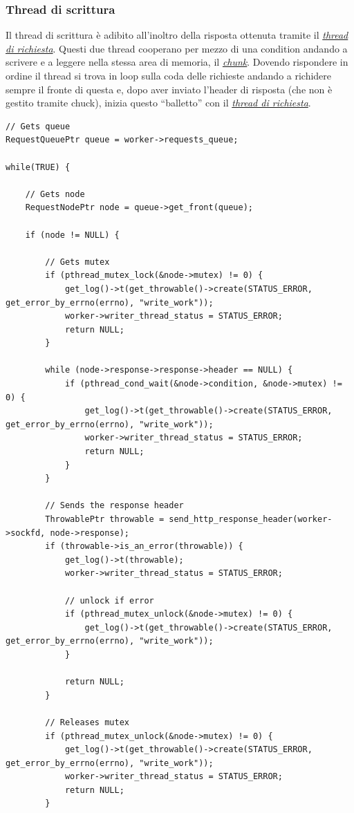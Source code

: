 \documentclass[italian]{tktltiki2}
\begin{document}
\subsubsection{Thread di scrittura}
\label{sec:writer}
Il thread di scrittura è adibito all'inoltro della risposta ottenuta tramite il \hyperref[sec:request]{\emph{thread di richiesta}}. Questi due thread cooperano per mezzo di una condition andando a scrivere e a leggere nella stessa area di memoria, il \hyperref[sec:chunk]{\emph{chunk}}. Dovendo rispondere in ordine il thread si trova in loop sulla coda delle richieste andando a richidere sempre il fronte di questa e, dopo aver inviato l'header di risposta (che non è gestito tramite chuck), inizia questo ``balletto'' con il \hyperref[sec:request]{\emph{thread di richiesta}}.
\begin{lstlisting}
// Gets queue
RequestQueuePtr queue = worker->requests_queue;

while(TRUE) {

    // Gets node
    RequestNodePtr node = queue->get_front(queue);

    if (node != NULL) {

        // Gets mutex
        if (pthread_mutex_lock(&node->mutex) != 0) {
            get_log()->t(get_throwable()->create(STATUS_ERROR, get_error_by_errno(errno), "write_work"));
            worker->writer_thread_status = STATUS_ERROR;
            return NULL;
        }  

        while (node->response->response->header == NULL) {
            if (pthread_cond_wait(&node->condition, &node->mutex) != 0) {
                get_log()->t(get_throwable()->create(STATUS_ERROR, get_error_by_errno(errno), "write_work"));
                worker->writer_thread_status = STATUS_ERROR;
                return NULL;
            }
        }

        // Sends the response header
        ThrowablePtr throwable = send_http_response_header(worker->sockfd, node->response);
        if (throwable->is_an_error(throwable)) {
            get_log()->t(throwable);
            worker->writer_thread_status = STATUS_ERROR;
            
            // unlock if error
            if (pthread_mutex_unlock(&node->mutex) != 0) {
                get_log()->t(get_throwable()->create(STATUS_ERROR, get_error_by_errno(errno), "write_work"));
            }

            return NULL;
        }
        
        // Releases mutex
        if (pthread_mutex_unlock(&node->mutex) != 0) {
            get_log()->t(get_throwable()->create(STATUS_ERROR, get_error_by_errno(errno), "write_work"));
            worker->writer_thread_status = STATUS_ERROR;
            return NULL;
        }


\end{lstlisting}
\end{document}
